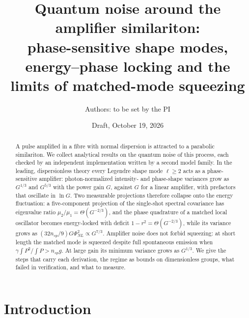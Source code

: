 \documentclass[aps,pra,twocolumn,superscriptaddress,nofootinbib,floatfix]{revtex4-2}
\begin{document}
\title{Quantum noise around the amplifier similariton:\\
phase-sensitive shape modes, energy--phase locking and the limits of matched-mode squeezing}

\author{Authors: to be set by the PI}
\noaffiliation

\date{Draft, October 19, 2026}

\begin{abstract}
A pulse amplified in a fibre with normal dispersion is attracted to a parabolic similariton. We collect analytical
results on the quantum noise of this process, each checked by an independent implementation written by a second model
family. In the leading, dispersionless theory every Legendre shape mode $\ell\ge2$ acts as a phase-sensitive amplifier:
photon-normalized intensity- and phase-shape variances grow as $G^{1/3}$ and $G^{5/3}$ with the power gain $G$, against
$G$ for a linear amplifier, with prefactors that oscillate in $\ln G$. Two measurable projections therefore collapse onto
the energy fluctuation: a five-component projection of the single-shot spectral covariance has eigenvalue ratio
$\mu_2/\mu_1=\Theta(G^{-2/3})$, and the phase quadrature of a matched local oscillator becomes energy-locked with
deficit $1-r^2=\Theta(G^{-2/3})$, while its variance grows as $(32n_{sp}/9)G\Phi_{NL}^2\propto G^{7/3}$. Amplifier
noise does not forbid squeezing: at short length the matched mode is squeezed despite full spontaneous emission when
$\gamma\int P^2/\int P>n_{sp}g$. At large gain its minimum variance grows as $G^{1/3}$. We give the steps that carry each
derivation, the regime as bounds on dimensionless groups, what failed in verification, and what to measure.
\end{abstract}

\maketitle

\section{Introduction}
\end{document}
